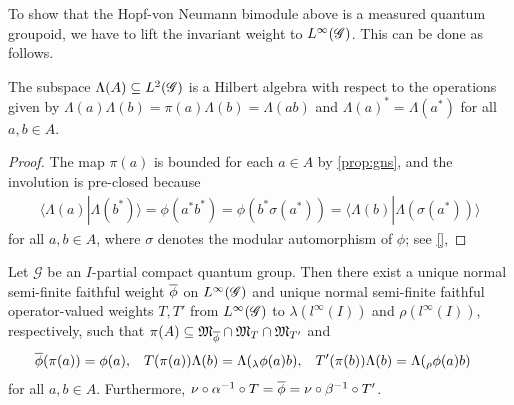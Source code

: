 To show that the Hopf-von Neumann bimodule above is a measured quantum
groupoid, we have to lift the invariant weight to $L^{\infty}(\mathscr{G})$. This can
be done as follows.
\begin{Lem} \label{lemma:hilbert-algebra}
  The subspace $\Lambda(A) \subseteq L^{2}(\mathscr{G})$ is a Hilbert algebra with
  respect to the operations given by
  $\Lambda(a)\Lambda(b)=\pi(a)\Lambda(b)=\Lambda(ab)$ and
  $\Lambda(a)^{*}= \Lambda(a^{*})$ for all $a,b\in A$.
\end{Lem}
\begin{proof}
  The map $\pi(a)$ is bounded for each $a \in A$ by \ref{prop:gns},
  and the involution is pre-closed because
  \begin{align*}
    \langle \Lambda(a)|\Lambda(b^{*})\rangle = \phi(a^{*}b^{*}) =
    \phi(b^{*}\sigma(a^{*})) = \langle
    \Lambda(b)|\Lambda(\sigma(a^{*}))\rangle
  \end{align*}
  for all $a,b \in A$, where $\sigma$ denotes the modular automorphism
  of $\phi$; see \ref{},
\end{proof}
\begin{Prop}
  Let $\mathscr{G}$ be an $I$-partial compact quantum group. Then there exist a unique normal
  semi-finite faithful weight $\overline{\phi}$ on $L^{\infty}(\mathscr{G})$ and unique normal
  semi-finite faithful operator-valued weights $T,T'$ from $L^{\infty}(\mathscr{G})$ to
  $\lambda(l^{\infty}(I))$ and $\rho(l^{\infty}(I))$, respectively,
  such that $\pi(A) \subseteq \mathfrak{M}_{\overline{\phi}} \cap
  \mathfrak{M}_{T} \cap \mathfrak{M}_{T'}$ and
  \begin{align}\label{eq:vnphi}
    \overline{\phi}(\pi(a))&= \phi(a), &
    T(\pi(a))\Lambda(b) &= \Lambda(_{\lambda}\phi(a)b), &
    T'(\pi(b))\Lambda(b) &= \Lambda(_{\rho}\phi(a)b)        
  \end{align}
  for all $a,b\in A$. Furthermore, $\nu \circ \alpha^{-1} \circ T = \overline{\phi} =
  \nu \circ \beta^{-1} \circ T'$. 
\end{Prop}
